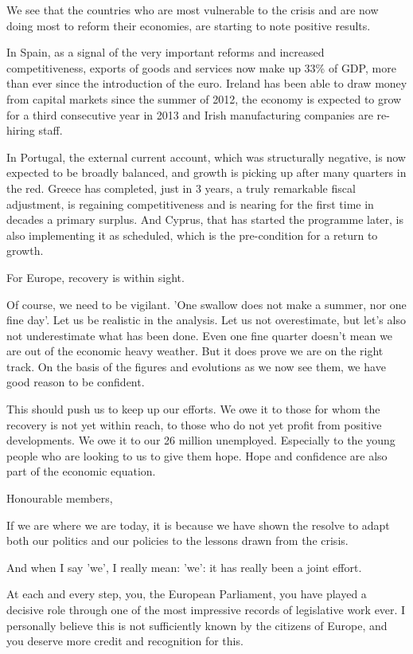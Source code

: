 \documentclass[a4paper,11pt]{article}
\begin{document}
We see that the countries who are most vulnerable to the crisis and are now doing most to reform their economies, are starting to note positive results.

In Spain, as a signal of the very important reforms and increased competitiveness, exports of goods and services now make up 33\% of GDP, more than ever since the introduction of the euro. Ireland has been able to draw money from capital markets since the summer of 2012, the economy is expected to grow for a third consecutive year in 2013 and Irish manufacturing companies are re-hiring staff.

In Portugal, the external current account, which was structurally negative, is now expected to be broadly balanced, and growth is picking up after many quarters in the red. Greece has completed, just in 3 years, a truly remarkable fiscal adjustment, is regaining competitiveness and is nearing for the first time in decades a primary surplus. And Cyprus, that has started the programme later, is also implementing it as scheduled, which is the pre-condition for a return to growth.

For Europe, recovery is within sight.

Of course, we need to be vigilant. 'One swallow does not make a summer, nor one fine day'. Let us be realistic in the analysis. Let us not overestimate, but let's also not underestimate what has been done. Even one fine quarter doesn't mean we are out of the economic heavy weather. But it does prove we are on the right track. On the basis of the figures and evolutions as we now see them, we have good reason to be confident.

This should push us to keep up our efforts. We owe it to those for whom the recovery is not yet within reach, to those who do not yet profit from positive developments. We owe it to our 26 million unemployed. Especially to the young people who are looking to us to give them hope. Hope and confidence are also part of the economic equation.

Honourable members,

If we are where we are today, it is because we have shown the resolve to adapt both our politics and our policies to the lessons drawn from the crisis.

And when I say 'we', I really mean: 'we': it has really been a joint effort.

At each and every step, you, the European Parliament, you have played a decisive role through one of the most impressive records of legislative work ever. I personally believe this is not sufficiently known by the citizens of Europe, and you deserve more credit and recognition for this.
\end{document}
